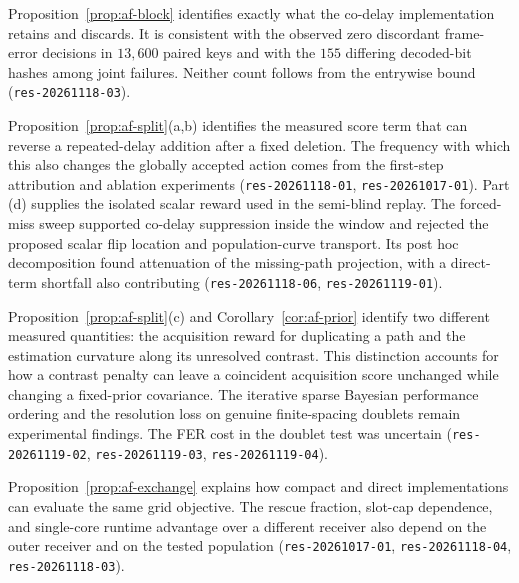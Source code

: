 \begin{afdmremark}
Proposition~\ref{prop:af-block} identifies exactly what the co-delay
implementation retains and discards. It is consistent with the observed
zero discordant frame-error decisions in $13{,}600$ paired keys and
with the $155$ differing decoded-bit hashes among joint failures.
Neither count follows from the entrywise bound
(\texttt{res-20261118-03}).

Proposition~\ref{prop:af-split}(a,b) identifies the measured score
term that can reverse a repeated-delay addition after a fixed deletion.
The frequency with which this also changes the globally accepted action
comes from the first-step attribution and ablation experiments
(\texttt{res-20261118-01}, \texttt{res-20261017-01}).
Part (d) supplies the isolated scalar reward used in the semi-blind
replay. The forced-miss sweep supported co-delay suppression inside
the window and rejected the proposed scalar flip location and
population-curve transport. Its post hoc decomposition found attenuation
of the missing-path projection, with a direct-term shortfall also
contributing (\texttt{res-20261118-06}, \texttt{res-20261119-01}).

Proposition~\ref{prop:af-split}(c) and Corollary~\ref{cor:af-prior}
identify two different measured quantities: the acquisition reward
for duplicating a path and the estimation curvature along its unresolved
contrast. This distinction accounts for how a contrast penalty can
leave a coincident acquisition score unchanged while changing a
fixed-prior covariance. The iterative sparse Bayesian performance
ordering and the resolution loss on genuine finite-spacing doublets
remain experimental findings. The FER cost in the doublet test was
uncertain (\texttt{res-20261119-02}, \texttt{res-20261119-03},
\texttt{res-20261119-04}).

Proposition~\ref{prop:af-exchange} explains how compact and direct
implementations can evaluate the same grid objective. The rescue
fraction, slot-cap dependence, and single-core runtime advantage over
a different receiver also depend on the outer receiver and on the
tested population (\texttt{res-20261017-01}, \texttt{res-20261118-04},
\texttt{res-20261118-03}).
\end{afdmremark}

